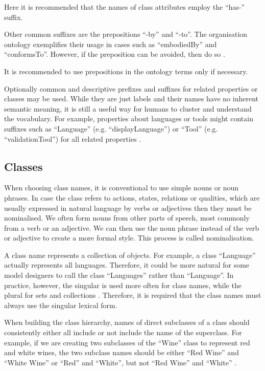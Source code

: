 	Here it is recommended that the names of class attributes employ the ``has-'' suffix.
	
	Other common suffixes are the prepositions ``-by'' and ``-to''. The organisation ontology \citep{org-ontology} exemplifies their usage in cases such as ``embodiedBy'' and ``conformsTo''. However, if the preposition can be avoided, then do so \cite{d3.1-2015}.
	
	It is recommended to use prepositions in the ontology terms only if necessary.
	
	Optionally common and descriptive prefixes and suffixes for related properties or classes may be used. While they are just labels and their names have no inherent semantic meaning, it is still a useful way for humans to cluster and understand the vocabulary. For example, properties about languages or tools might contain suffixes such as ``Language'' (e.g. ``displayLanguage'') or ``Tool'' (e.g. ``validationTool'') for all related properties \cite{d2.01-2017}.
	
	\subsection{Classes}
	\label{sec:classes}
	
	When choosing class names, it is conventional to use simple nouns or noun phrases. In case the class refers to actions, states, relations or qualities, which are usually expressed in natural language by verbs or adjectives then they must be nominalised. We often form nouns from other parts of speech, most commonly from a verb or an adjective. We can then use the noun phrase instead of the verb or adjective to create a more formal style. This process is called nominalisation. 
	
	A class name represents a collection of objects. For example, a class ``Language'' actually represents all languages. Therefore, it could be more natural for some model designers to call the class ``Languages'' rather than ``Language''. In practice, however, the singular is used more often for class names, while the plural for sets and collections \cite{noy2001}. Therefore, it is required that the class names must always use the singular lexical form. 
	
	When building the class hierarchy, names of direct subclasses of a class should consistently either all include or not include the name of the superclass. For example, if we are creating two subclasses of the ``Wine'' class to represent red and white wines, the two subclass names should be either ``Red Wine'' and ``White Wine'' or ``Red'' and ``White'', but not ``Red Wine'' and ``White'' \cite{noy2001}.
	
